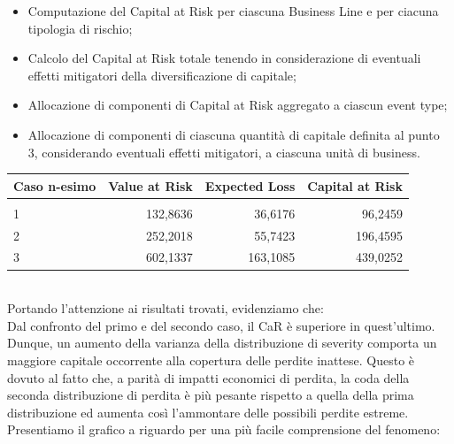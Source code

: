 \documentclass[titlepage]{article}
\begin{document}
\begin{itemize}
\begin{itemize}
	\item 	Computazione del Capital at Risk per ciascuna Business Line e per ciacuna tipologia di rischio;
	\item Calcolo del Capital at Risk totale tenendo in considerazione di eventuali effetti mitigatori della diversificazione di capitale;
	\item 	Allocazione di componenti di Capital at Risk aggregato a ciascun event type;
	\item 	Allocazione di componenti di ciascuna quantità di capitale definita al punto 3, considerando eventuali effetti mitigatori, a ciascuna unità di business.
\end{itemize}
\begin{table}[htbp]
	\centering
	\begin{tabular}{l|rrr}
		Caso n-esimo & Value at Risk & Expected Loss& Capital at Risk \\\hline
		\\
		1 & 132,8636&36,6176&96,2459 \\
		2 & 252,2018 &55,7423&196,4595\\
		3 & 602,1337 &163,1085&439,0252
	\end{tabular}
\end{table}
\\

Portando l’attenzione ai risultati trovati, evidenziamo che:
\\

		Dal confronto del primo e del secondo caso, il CaR è superiore in quest’ultimo. Dunque, un aumento della varianza della distribuzione di severity comporta un maggiore capitale occorrente alla copertura delle perdite inattese. Questo è dovuto al fatto che, a parità di impatti economici di perdita, la coda della seconda distribuzione di perdita è più pesante rispetto a quella della prima distribuzione ed aumenta così l’ammontare delle possibili perdite estreme. Presentiamo il grafico a riguardo per una più facile comprensione del fenomeno:




\end{itemize}
\end{document}
